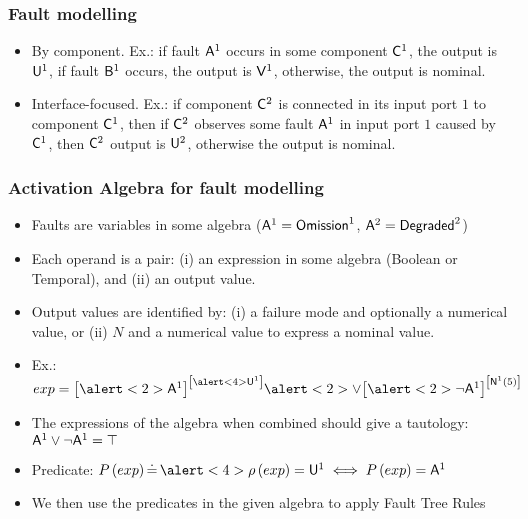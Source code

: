 \begin{frame}
\frametitle{Fault modelling}

\begin{itemize}
  \item By component. Ex.: if fault $\mathsf{A}^{1}$ occurs in some component $\mathsf{C}^{1}$, the output is $\mathsf{U}^{1}$, if fault $\mathsf{B}^{1}$ occurs, the output is $\mathsf{V}^{1}$, otherwise, the output is nominal.
  \item Interface-focused. Ex.: if component $\mathsf{C}^{2}$ is connected in its input port $1$ to component $\mathsf{C}^{1}$, then if $\mathsf{C}^{2}$ observes some fault $\mathsf{A}^{1}$ in input port $1$ caused by $\mathsf{C}^{1}$, then $\mathsf{C}^{2}$ output is $\mathsf{U}^{2}$, otherwise the output is nominal.
\end{itemize}

\end{frame}

\begin{frame}
\frametitle{Activation Algebra for fault modelling}
\begin{itemize}
  \item Faults are variables in some algebra ($\mathsf{A}^{1} = \mathsf{Omission}^{1}$, $\mathsf{A}^{2}=\mathsf{Degraded}^{2}$)
  \item Each operand is a pair: (i) an expression in some algebra (Boolean or Temporal), and (ii) an output value.
  \item Output values are identified by: (i) a failure mode and optionally a numerical value, or (ii) $N$ and a numerical value to express a nominal value. 
  \item Ex.: $exp = \aaexp{\alert<2>{\failurevalue{A}{1}}}{\alert<4>{\outvalue{U}{1}}} \alert<2>{\lor} \aaexp{\alert<2>{\lnot \failurevalue{A}{1}}}{\nominalvalue{5}{1}}$
  \item<2-> The expressions of the algebra when combined should give a tautology: $\mathsf{A}^{1} \lor \lnot \mathsf{A}^{1} = \top$
  \item<3-> Predicate:
  $P\left(exp\right) \defs \alert<4>{\outvalueof{exp}=\outvalue{U}{1}} \iff 
  P\left(exp\right) = \failurevalue{A}{1}$
  \item<4-> We then use the predicates in the given algebra to apply Fault Tree Rules
\end{itemize}
\end{frame}

